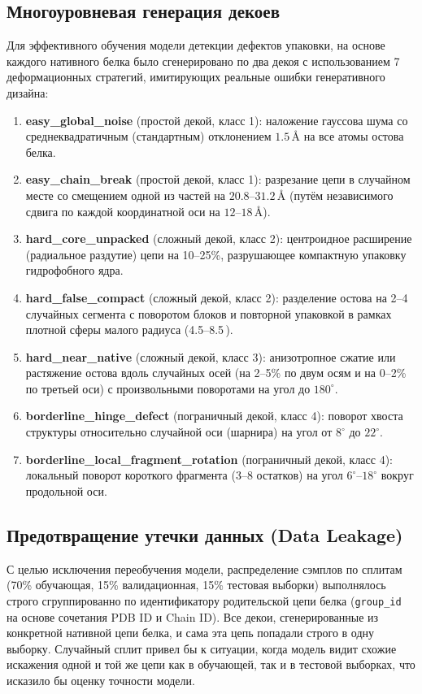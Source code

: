 \documentclass[12pt, a4paper]{article}
\begin{document}
\subsection{Многоуровневая генерация декоев}
Для эффективного обучения модели детекции дефектов упаковки, на основе каждого нативного белка было сгенерировано по два декоя с использованием 7 деформационных стратегий, имитирующих реальные ошибки генеративного дизайна:
\begin{enumerate}
    \item \textbf{easy\_global\_noise} (простой декой, класс 1): наложение гауссова шума со среднеквадратичным (стандартным) отклонением $1.5\,\text{\AA}$ на все атомы остова белка.
    \item \textbf{easy\_chain\_break} (простой декой, класс 1): разрезание цепи в случайном месте со смещением одной из частей на $20.8$--$31.2\,\text{\AA}$ (путём независимого сдвига по каждой координатной оси на $12$--$18\,\text{\AA}$).
    \item \textbf{hard\_core\_unpacked} (сложный декой, класс 2): центроидное расширение (радиальное раздутие) цепи на 10--25\%, разрушающее компактную упаковку гидрофобного ядра.
    \item \textbf{hard\_false\_compact} (сложный декой, класс 2): разделение остова на 2--4 случайных сегмента с поворотом блоков и повторной упаковкой в рамках плотной сферы малого радиуса (4.5--8.5\,\text{\AA}).
    \item \textbf{hard\_near\_native} (сложный декой, класс 3): анизотропное сжатие или растяжение остова вдоль случайных осей (на 2--5\% по двум осям и на 0--2\% по третьей оси) с произвольными поворотами на угол до $180^\circ$.
    \item \textbf{borderline\_hinge\_defect} (пограничный декой, класс 4): поворот хвоста структуры относительно случайной оси (шарнира) на угол от $8^\circ$ до $22^\circ$.
    \item \textbf{borderline\_local\_fragment\_rotation} (пограничный декой, класс 4): локальный поворот короткого фрагмента (3--8 остатков) на угол $6^\circ$--$18^\circ$ вокруг продольной оси.
\end{enumerate}

\subsection{Предотвращение утечки данных (Data Leakage)}
С целью исключения переобучения модели, распределение сэмплов по сплитам (70\% обучающая, 15\% валидационная, 15\% тестовая выборки) выполнялось строго сгруппированно по идентификатору родительской цепи белка (\texttt{group\_id} на основе сочетания PDB ID и Chain ID). Все декои, сгенерированные из конкретной нативной цепи белка, и сама эта цепь попадали строго в одну выборку. Случайный сплит привел бы к ситуации, когда модель видит схожие искажения одной и той же цепи как в обучающей, так и в тестовой выборках, что исказило бы оценку точности модели.
\end{document}
